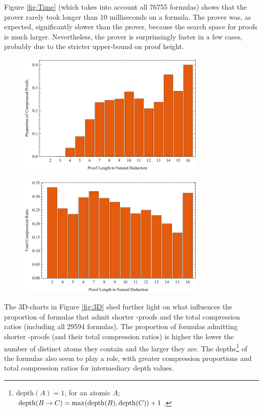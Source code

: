 \documentclass{llncs}
\begin{document}
Figure \ref{fig:Time} (which takes into account all 76755 formulas) shows that the {\ND} prover rarely took longer than 10 milliseconds on a formula. The {\NDd} prover was, as expected, significantly slower than the {\ND} prover, because the search space for {\NDd} proofs is much larger. Nevertheless, the {\NDd} prover is surprinsingly faster in a few cases, probably due to the stricter upper-bound on proof height. 


\begin{figure}[!ht]
        \centering
        \includegraphics[width=0.8\textwidth]{Charts/ProportionByLength.pdf}
        \caption{ } \label{fig:ProportionByLength}
\end{figure}

\begin{figure}[!ht]
        \centering
        \includegraphics[width=0.8\textwidth]{Charts/CompressionByLength.pdf}
        \caption{ } \label{fig:CompressionByLength}
\end{figure}

\noindent
The 3D-charts in Figure \ref{fig:3D} shed further light on what influences the proportion of formulas that admit shorter {\NDd}-proofs and the total compression ratios (including all 29594 formulas). The proportion of formulas admitting shorter {\NDd}-proofs (and their total compression ratios) is higher the lower the number of distinct atoms they contain and the larger they are. The depths\footnote{$\mathrm{depth}(A) = 1$, for an atomic $A$; $\mathrm{depth}(B \rightarrow C) = \mathrm{max}(\mathrm{depth}(B), \mathrm{depth}(C)) + 1$.} of the formulas also seem to play a role, with greater compression proportions and total compression ratios for intermediary depth values.
\end{document}
